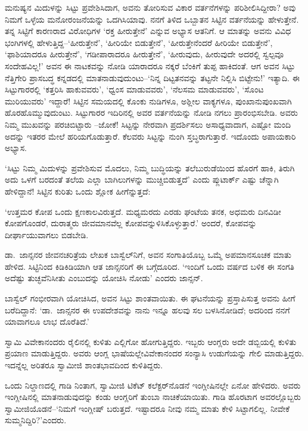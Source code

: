 ಮನುಷ್ಯನ ಮಿದುಳನ್ನು ಸಿಟ್ಟು ಪ್ರವೇಶಿಸಿದಾಗ, ಅವನು ತೋರಿಸುವ ವಿಕಾರ ವರ್ತನೆಗಳನ್ನು ಪರಿಶೀಲಿಸಿದ್ದೀರಾ? ಅವು ನಿಮಗೆ ಒಳ್ಳೆಯ ಮನೋರಂಜನೆಯನ್ನು ಒದಗಿಸಿಯಾವು. ನನಗೆ ತಿಳಿದ ಒಬ್ಬಾತನ ಸಿಟ್ಟಿನ ವರ್ತನೆಯನ್ನು ಹೇಳುತ್ತೇನೆ. ತನ್ನ ಸಿಟ್ಟಿಗೆ ಕಾರಣರಾದ ವಿರೋಧಿಗಳ ‘ರಕ್ತ ಹೀರುತ್ತೇನೆ’ ಎನ್ನುವ ಅಭ್ಯಾಸ ಆತನಿಗೆ. ಆ ಮಾತನ್ನು ಅವನು ವಿವಿಧ ಭಂಗಿಗಳಲ್ಲಿ ಹೇಳುತ್ತಿದ್ದ–‘ಹೀರುತ್ತೇನೆ’, ‘ಹೀರಿಯೇ ಬಿಡುತ್ತೇನೆ’, ‘ಹೀರುತ್ತೇನೆಂದರೆ ಹೀರಿಯೇ ಬಿಡುತ್ತೇನೆ’, ‘ಫಾಶಿಯಾದರೂ ಹೀರುತ್ತೇನೆ’, ‘ಗಡೀಪಾರಾದರೂ ಹೀರುತ್ತೇನೆ’, ‘ಹೀರುವುದು, ಹೀರುವುದೇ ಅದರಲ್ಲಿ ಸ್ವಲ್ಪವೂ ಸಂದೇಹವಿಲ್ಲ!’ ಅವನ ಈ ನಾಟಕವನ್ನು ನೋಡಿ ಯಾರಾದರೂ ನಕ್ಕರೆ ಬೆಂಕಿಗೆ ತುಪ್ಪ ಹಾಕಿದಂತೆ. ಆಗ ಅವನ ಸಿಟ್ಟು ನೆತ್ತಿಗೇರಿ ಪ್ರಾಸಬದ್ಧ ಕನ್ನಡದಲ್ಲಿ ಮಾತನಾಡುವುದುಂಟು–‘ನಿನ್ನ ದಿಟ್ಟತನವನ್ನು ತಟ್ಟನೇ ನಿಲ್ಲಿಸಿ ಬಿಟ್ಟೇನು!’ ಇತ್ಯಾದಿ. ಈ ಸಿಟ್ಟುಗಾರರಲ್ಲಿ ‘ಕತ್ತರಿಸಿ ಹಾಕುವವರು’, ‘ಧ್ವಂಸ ಮಾಡುವವರು’, ‘ನೆಲಸಮ ಮಾಡುವವರು’, ‘ಸೊಂಟ ಮುರಿಯುವರು’ ಇದ್ದಾರೆ! ಸಿಟ್ಟಿನ ಸಮಯದಲ್ಲಿ ಕೊಂಕು ನುಡಿಗಳೂ, ಅಶ್ಲೀಲ ವಾಕ್ಯಗಳೂ, ಪುಂಖಾನುಪುಂಖವಾಗಿ ಹೊರಹೊಮ್ಮುವುದುಂಟು. ಸಿಟ್ಟುಗಾರರ ಇದಿರಿನಲ್ಲಿ ಅವರ ವರ್ತನೆಯನ್ನು ನೋಡಿ ನಗಲು ಪ್ರಾರಂಭಿಸಬೇಡಿ. ಅವರು ನಿಮ್ಮ ಮುಖವನ್ನು ಪರಚಿಬಿಟ್ಟಾರು –ಜೋಕೆ! ಸಿಟ್ಟನ್ನು ನೇರವಾಗಿ ಪ್ರದರ್ಶಿಸಲು ಅಸಾಧ್ಯವಾದಾಗ, ಎಷ್ಟೋ ಮಂದಿ ಅದನ್ನು ಇತರರ ಮೇಲೆ ಹರಿಯಗೊಡುತ್ತಾರೆ. ಕೆಲವರು ಸಿಟ್ಟನ್ನು ನುಂಗಿ ಸ್ತಬ್ಧರಾಗುತ್ತಾರೆ. ಇದೊಂದು ಅಪಾಯಕಾರಿ ಅಭ್ಯಾಸ.

‘ಸಿಟ್ಟು ನಿಮ್ಮ ಮಿದುಳನ್ನು ಪ್ರವೇಶಿಸುವ ಮೊದಲು, ನಿಮ್ಮ ಬುದ್ಧಿಯನ್ನು ತಲೆಬುರುಡೆಯಿಂದ ಹೊರಗೆ ಹಾಕಿ, ತಿರುಗಿ ಅದು ಒಳಗೆ ಬರದಂತೆ ತಲೆಯ ಎಲ್ಲಾ ಬಾಗಿಲುಗಳನ್ನು ಮುಚ್ಚಿಬಿಡುತ್ತದೆ’ ಎಂದು ಪ್ಲುಟಾರ್ಕ್ ಎಷ್ಟು ಚೆನ್ನಾಗಿ ಹೇಳಿದ್ದಾನೆ! ಸಿಟ್ಟಿನ ಕುರಿತು ಒಂದು ಶ್ಲೋಕ ಹೀಗೆನ್ನುತ್ತದೆ:

‘ಉತ್ತಮರ ಕೋಪ ಒಂದು ಕ್ಷಣಕಾಲವಿರುತ್ತದೆ. ಮಧ್ಯಮರದು ಎರಡು ಘಂಟೆಯ ತನಕ, ಅಧಮರು ದಿನವಿಡೀ ಕೋಪಗೊಂಡರೆ, ದುರಾತ್ಮರು ಜೀವಮಾನವೆಲ್ಲ ಕೋಪವನ್ನುಳಿಸಿ\-ಕೊಳ್ಳುತ್ತಾರೆ.’ ಅಂದರೆ, ಕೋಪವನ್ನು ದೀರ್ಘಾಯುವಾಗಲು ಬಿಡಬೇಡಿ.

ಡಾ.\ ಜಾನ್ಸನರ ಜೀವನಚರಿತ್ರೆಯ ಲೇಖಕ ಬಾಸ್ವೆಲ್​ನಿಗೆ, ಅವನ ಸಂಗಾತಿಯೊಬ್ಬ ಒಮ್ಮೆ ಅಪಮಾನಸೂಚಕ ಮಾತು ಹೇಳಿದ. ಸಿಟ್ಟಿನಿಂದ ಕಿಡಿಕಿಡಿಯಾಗಿ ಆತ ಜಾನ್ಸನರಿಗೆ ಈ ಬಗ್ಗೆ\break ದೂರಿದ. ‘ಇಂದಿಗೆ ಒಂದು ವರ್ಷದ ಬಳಿಕ ಈ ಸಂಗತಿ ಅದೆಷ್ಟು ತುಚ್ಛವೆನಿಸೀತು ಎಂಬುದನ್ನು ಯೋಚಿಸಿ ನೋಡು’ ಎಂದರು ಜಾನ್ಸನ್.

ಬಾಸ್ವೆಲ್ ಗಂಭೀರವಾಗಿ ಯೋಚಿಸಿದ, ಅವನ ಸಿಟ್ಟು ಶಾಂತವಾಯಿತು. ಈ ಘಟನೆಯನ್ನು ಪ್ರಸ್ತಾಪಿಸುತ್ತ ಅವನು ಹೀಗೆ ಬರೆದಿದ್ದಾನೆ: ‘ಡಾ.\ ಜಾನ್ಸನರ ಈ ಉಪದೇಶವನ್ನು ನಾನು ಇನ್ನೂ ಹಲವು ಸಲ ಬಳಸಿನೋಡಿದೆ; ಅದರಿಂದ ನನಗೆ ಯಾವಾಗಲೂ ಲಾಭ ದೊರೆತಿದೆ.’

ಸ್ವಾಮಿ ವಿವೇಕಾನಂದರು ರೈಲಿನಲ್ಲಿ ಕುಳಿತು ಎಲ್ಲಿಗೋ ಹೋಗುತ್ತಿದ್ದರು. ಇಬ್ಬರು ಆಂಗ್ಲರು ಅದೇ ಡಬ್ಬಿಯಲ್ಲಿ ಕುಳಿತು ಪ್ರಯಾಣ ಮಾಡುತ್ತಿದ್ದರು. ಅವರು ಆಂಗ್ಲ ಭಾಷೆಯಲ್ಲೇ\break ವಿವೇಕಾನಂದರ ಸಂನ್ಯಾಸಿ ಉಡುಗೆಯನ್ನು ಗೇಲಿ ಮಾಡುತ್ತಿದ್ದರು. ಇದನ್ನೆಲ್ಲ ಅರಿತರೂ ಸ್ವಾಮೀಜಿ ಶಾಂತಭಾವದಿಂದ ಕುಳಿತಿದ್ದರು.

\newpage

ಒಂದು ನಿಲ್ದಾಣದಲ್ಲಿ ಗಾಡಿ ನಿಂತಾಗ, ಸ್ವಾಮೀಜಿ ಟಿಕೆಟ್ ಕಲೆಕ್ಟರ್​ನೊಡನೆ ಇಂಗ್ಲೀಷಿನಲ್ಲೇ ಏನೋ ಹೇಳಿದರು. ಅವರು ಇಂಗ್ಲೀಷಿನಲ್ಲಿ ಮಾತನಾಡುವುದನ್ನು ಕಂಡು ಆಂಗ್ಲರಿಗೆ ತುಂಬಾ ನಾಚಿಕೆಯಾಯಿತು. ಗಾಡಿ ಹೊರಟಾಗ ಅವರಲ್ಲೊಬ್ಬರು ಸ್ವಾಮೀಜಿಯೊಡನೆ–‘ನಿಮಗೆ ಇಂಗ್ಲೀಷ್ ಬರುತ್ತದೆ. ಇಷ್ಟಾದರೂ ನೀವು ನಮ್ಮ ಮಾತು ಕೇಳಿ ಸಿಟ್ಟಾಗಲಿಲ್ಲ. ನೀವೇಕೆ ಸುಮ್ಮನಿದ್ದಿರಿ?’\break ಎಂದರು.


